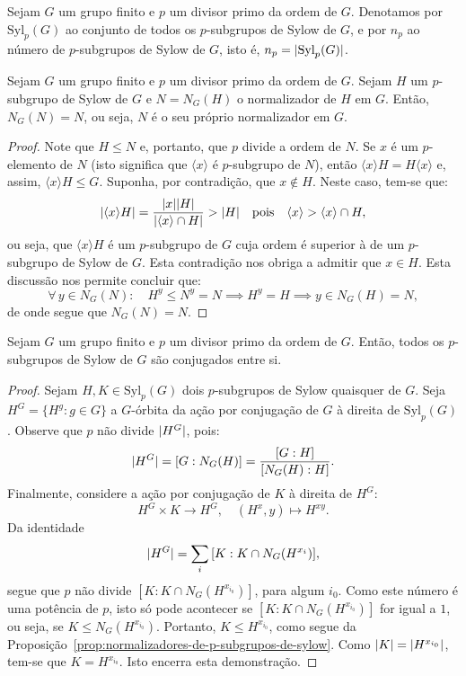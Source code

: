 \begin{definition}
  Sejam $G$ um grupo finito e $p$ um divisor primo da ordem de $G$. Denotamos por $\text{Syl}_{p}(G)$ ao conjunto de todos os $p$-subgrupos de Sylow de $G$, e por $n_{p}$ ao número de $p$-subgrupos de Sylow de $G$, isto é, $n_{p}=\lvert\text{Syl}_{p}(G)\rvert$.
\end{definition}

\begin{proposition}\label{prop:normalizadores-de-p-subgrupos-de-sylow}
  Sejam $G$ um grupo finito e $p$ um divisor primo da ordem de $G$. Sejam $H$ um $p$-subgrupo de Sylow de $G$ e $N=N_{G}(H)$ o normalizador de $H$ em $G$. Então, $N_{G}(N)=N$, ou seja, $N$ é o seu próprio normalizador em $G$.
\end{proposition}

\begin{proof}
  Note que $H\leqslant{N}$ e, portanto, que $p$ divide a ordem de $N$. Se $x$ é um $p$-elemento de $N$ (isto significa que $\langle{x}\rangle$ é $p$-subgrupo de $N$), então $\langle{x}\rangle{H}=H\langle{x}\rangle$ e, assim, $\langle{x}\rangle{H}\leqslant{G}$. Suponha, por contradição, que $x\notin{H}$. Neste caso, tem-se que:
  \[
    \lvert\langle{x}\rangle{H}\rvert=\frac{\lvert x\rvert\lvert H\rvert}{\lvert\langle{x}\rangle\cap{H}\rvert}>\lvert H\rvert\quad\text{pois}\quad\langle{x}\rangle>\langle{x}\rangle\cap{H},
  \]
  ou seja, que $\langle{x}\rangle{H}$ é um $p$-subgrupo de $G$ cuja ordem é superior à de um $p$-subgrupo de Sylow de $G$. Esta contradição nos obriga a admitir que $x\in{H}$. Esta discussão nos permite concluir que:
  \[
    \forall\,y\in{N_{G}(N)}:\quad{H^{y}\leqslant{N^{y}=N}\implies{H^{y}=H}\implies{y\in{N_{G}(H)=N}}},
  \]
  de onde segue que $N_{G}(N)=N$.
\end{proof}

\begin{theorem}[Sylow]\label{thm:segundo-teorema-de-sylow}
  Sejam $G$ um grupo finito e $p$ um divisor primo da ordem de $G$. Então, todos os $p$-subgrupos de Sylow de $G$ são conjugados entre si.
\end{theorem}

\begin{proof}
  Sejam $H,K\in\text{Syl}_{p}(G)$ dois $p$-subgrupos de Sylow quaisquer de $G$. Seja $H^{G}=\{H^{g}:g\in{G}\}$ a $G$-órbita da ação por conjugação de $G$ à direita de $\text{Syl}_{p}(G)$. Observe que $p$ não divide $\lvert H^{G}\rvert$, pois:
  \[
    \lvert H^{G}\rvert=[G:N_{G}(H)]=\frac{[G:H]}{[N_{G}(H):H]}.
  \]
  Finalmente, considere a ação por conjugação de $K$ à direita de $H^{G}$:
  \[
    H^{G}\times{K}\to{H^{G}},\quad{(H^{x},y)\mapsto{H^{xy}}}.
  \]
  Da identidade
  \[
    \lvert H^{G}\rvert=\sum_{i}\,[K:K\cap{N_{G}(H^{x_{i}})}],
  \]
  segue que $p$ não divide $[K:K\cap{N_{G}(H^{x_{i_{0}}})}]$, para algum $i_{0}$. Como este número é uma potência de $p$, isto só pode acontecer se $[K:K\cap{N_{G}(H^{x_{i_{0}}})}]$ for igual a $1$, ou seja, se $K\leqslant{N_{G}(H^{x_{i_{0}}})}$. Portanto, $K\leqslant{H^{x_{i_{0}}}}$, como segue da Proposição~\ref{prop:normalizadores-de-p-subgrupos-de-sylow}. Como $\lvert K\rvert=\lvert H^{x_{i_{0}}}\rvert$, tem-se que $K=H^{x_{i_{0}}}$. Isto encerra esta demonstração.
\end{proof}

